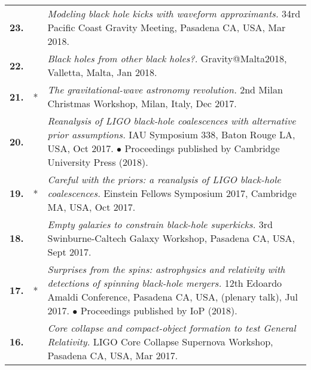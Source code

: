 {\begin{longtable}{rp{0.3cm}p{15.8cm}}
%
\textbf{23.} &  & \textit{Modeling black hole kicks with waveform approximants.}
\newline{}
 34rd Pacific Coast Gravity Meeting, Pasadena CA, USA, Mar 2018.
\vspace{0.05cm}\\
%
\textbf{22.} &  & \textit{Black holes from other black holes?.}
\newline{}
 Gravity@Malta2018, Valletta, Malta, Jan 2018.
\vspace{0.05cm}\\
%
\textbf{21.} & * & \textit{The gravitational-wave astronomy revolution.}
\newline{}
 2nd Milan Christmas Workshop, Milan, Italy, Dec 2017.
\vspace{0.05cm}\\
%
\textbf{20.} &  & \textit{Reanalysis of LIGO black-hole coalescences with alternative prior assumptions.}
\newline{}
 IAU Symposium 338, Baton Rouge LA, USA, Oct 2017.
\newline{}
\textcolor{color1}{$\bullet$} Proceedings published by Cambridge University Press (2018).
\vspace{0.05cm}\\
%
\textbf{19.} & * & \textit{Careful with the priors: a reanalysis of LIGO black-hole coalescences.}
\newline{}
 Einstein Fellows Symposium 2017, Cambridge MA, USA, Oct 2017.
\vspace{0.05cm}\\
%
\textbf{18.} &  & \textit{Empty galaxies to constrain black-hole superkicks.}
\newline{}
 3rd Swinburne-Caltech Galaxy Workshop, Pasadena CA, USA, Sept 2017.
\vspace{0.05cm}\\
%
\textbf{17.} & * & \textit{Surprises from the spins: astrophysics and relativity with detections of spinning black-hole mergers.}
\newline{}
12th Edoardo Amaldi Conference, Pasadena CA, USA, (plenary talk), Jul 2017.
\newline{}
\textcolor{color1}{$\bullet$} Proceedings published by IoP (2018).
\vspace{0.05cm}\\
%
\textbf{16.} &  & \textit{Core collapse and compact-object formation to test General Relativity.}
\newline{}
LIGO Core Collapse Supernova Workshop, Pasadena CA, USA, Mar 2017.
\vspace{0.05cm}\\

\end{longtable}}

